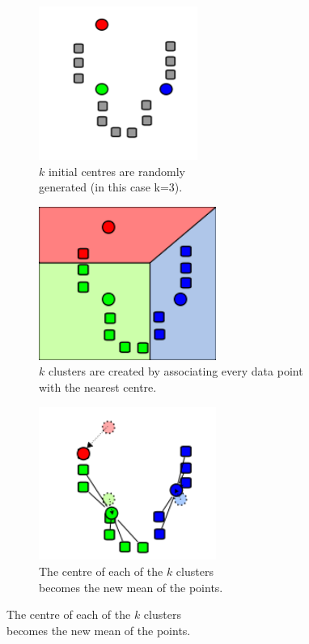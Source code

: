 \documentclass{article}
\begin{document}
\begin{figure}
    \begin{subfigure}{0.5\textwidth}
        \includegraphics[width=0.9\linewidth, height=5cm]{Pictures/K_Means_Example_Step_1.png}
        \caption{ $k$ initial centres are randomly\\ generated (in this case k=3).}
    \end{subfigure}
    \begin{subfigure}{0.5\textwidth}
        \includegraphics[width=0.9\linewidth, height=5cm]{Pictures/K_Means_Example_Step_2.png}
        \caption{ $k$ clusters are created by associating every data point with the nearest centre.}
    \end{subfigure}
    \begin{subfigure}{0.5\textwidth}
        \includegraphics[width=0.9\linewidth, height=5cm]{Pictures/K_Means_Example_Step_3.png}
        \caption{The centre of each of the $k$ clusters\\ becomes the new mean of the points.}
    \end{subfigure}

\end{figure}
\end{document}
